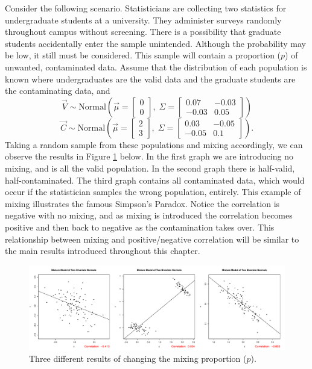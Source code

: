 Consider the following scenario. Statisticians are collecting two statistics for undergraduate students at a university. They administer surveys randomly throughout campus without screening. There is a possibility that graduate students accidentally enter the sample unintended. Although the probability may be low, it still must be considered. This sample will contain a proportion ($p$) of unwanted, contaminated data. Assume that the distribution of each population is known where undergraduates are the valid data and the graduate students are the contaminating data, and $$\vec{V}\sim\text{Normal}\left(\vec{\mu} = \begin{bmatrix}0\\ 0\end{bmatrix},\;\Sigma = \begin{bmatrix}0.07 & -0.03\\ -0.03 & 0.05\end{bmatrix}\right)$$ $$\vec{C}\sim\text{Normal}\left(\vec{\mu} = \begin{bmatrix}2\\ 3 \end{bmatrix},\;\Sigma = \begin{bmatrix}0.03 & -0.05\\ -0.05 & 0.1\end{bmatrix}\right).$$ Taking a random sample from these populations and mixing accordingly, we can observe the results in Figure \ref{fig:mixPlots} below. In the first graph we are introducing no mixing, and is all the valid population. In the second graph there is half-valid, half-contaminated. The third graph contains all contaminated data, which would occur if the statistician samples the wrong population, entirely. This example of mixing illustrates the famous Simpson's Paradox. Notice the correlation is negative with no mixing, and as mixing is introduced the correlation becomes positive and then back to negative as the contamination takes over. This relationship between mixing and positive/negative correlation will be similar to the main results introduced throughout this chapter.
\begin{figure}[H]
    \centering
    \includegraphics[scale=0.4]{images/mixturePlots.pdf}
    \caption{Three different results of changing the mixing proportion ($p$).}
    \label{fig:mixPlots}
\end{figure}

